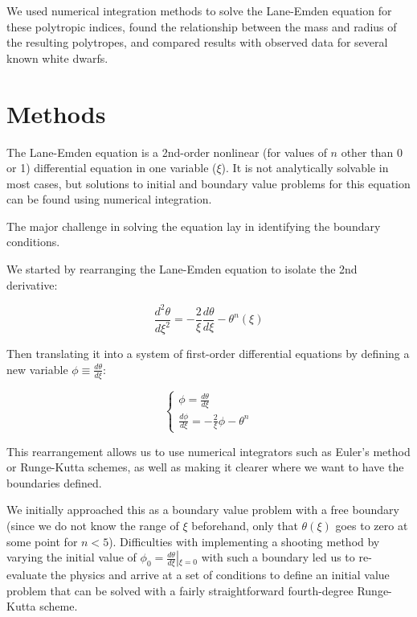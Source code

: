 \documentclass[twoside]{article}
\begin{document}
\begin{multicols}{2}
We used numerical integration methods to solve the Lane-Emden equation for these
polytropic indices, found the relationship between the mass and radius of the
resulting polytropes, and compared results with observed data for several known
white dwarfs.

\section{Methods}

The Lane-Emden equation is a 2nd-order nonlinear (for values of \(n\) other than
0 or 1) differential equation in one variable (\(\xi\)). It is not analytically
solvable in most cases, but solutions to initial and boundary value problems for
this equation can be found using numerical integration.

The major challenge in solving the equation lay in identifying the boundary
conditions. 

We started by rearranging the Lane-Emden equation to isolate the 2nd derivative:

\begin{equation}
    \label{eq:rearrle}
    \frac{d^2\theta}{d\xi^2}=-\frac{2}{\xi}\frac{d\theta}{d\xi}-\theta^n(\xi)
\end{equation}

Then translating it into a system of first-order differential equations by
defining a new variable \(\phi\equiv\frac{d\theta}{d\xi}\):

\begin{equation}
    \label{eq:sysle}
    \left\{\begin{array}{l}
        \phi = \frac{d\theta}{d\xi} \\
        \frac{d\phi}{d\xi} = -\frac{2}{\xi}\phi - \theta^n
    \end{array}\right.
\end{equation}

This rearrangement allows us to use numerical integrators such as Euler's method
or Runge-Kutta schemes, as well as making it clearer where we want to have the
boundaries defined.

We initially approached this as a boundary value problem with a free
boundary\cite[p.756]{nrinc} (since we do not know the range of \(\xi\)
beforehand, only that \(\theta(\xi)\) goes to zero at some point for \(n < 5\)).
Difficulties with implementing a shooting method\cite[pp.474--482]{gsnm} by
varying the initial value of \(\phi_0 =
\frac{d\theta}{d\xi}\left|_{\xi=0}\right.\) with such a boundary led us to
re-evaluate the physics and arrive at a set of conditions to define an initial
value problem that can be solved with a fairly straightforward fourth-degree
Runge-Kutta scheme\cite[pp.411--415]{gsnm}.


\end{multicols}
\end{document}
